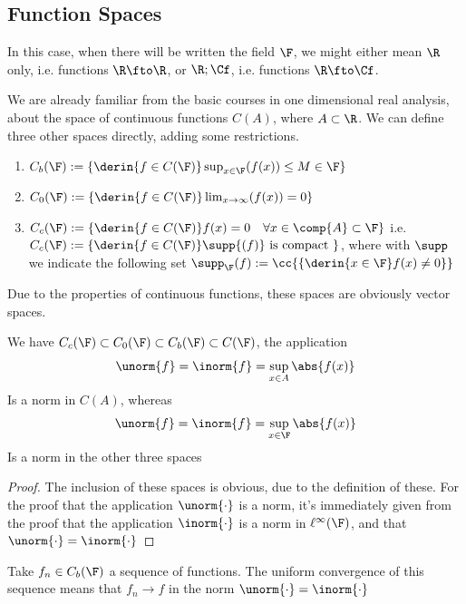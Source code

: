 \documentclass[../mmf.tex]{subfiles}
\begin{document}
\subsection{Function Spaces}
\begin{ntn}
	In this case, when there will be written the field $\F$, we might either mean $\R$ only, i.e. functions $\R\fto\R$, or $\R;\Cf$, i.e. functions $\R\fto\Cf$.
\end{ntn}
\begin{dfn}
	We are already familiar from the basic courses in one dimensional real analysis, about the space of continuous functions $C(A)$, where $A\subset\R$. We can define three other spaces directly, adding some restrictions.
	\begin{enumerate}
	\item $C_b(\F):=\{\derin{f\in C(\F)}\sup_{x\in\F}(f(x))\le M\in\F\}$
	\item $C_0(\F):=\{\derin{f\in C(\F)}\lim_{x\to\infty}(f(x))=0\}$
	\item $C_c(\F):=\{\derin{f\in C(\F)}f(x)=0\quad\forall x\in\comp{A}\subset\F\}$ i.e. $C_c(\F):=\{\derin{f\in C(\F)}\supp{(f)}\text{ is compact }\}$, where with $\supp$ we indicate the following set $\supp_{\F}(f):=\cc{\{\derin{x\in\F}f(x)\ne 0\}}$
	\end{enumerate}
\end{dfn}
Due to the properties of continuous functions, these spaces are obviously vector spaces.
\begin{prop}
	We have $C_c(\F)\subset C_0(\F)\subset C_b(\F)\subset C(\F)$, the application
	\begin{equation}
		\unorm{f}=\inorm{f}=\sup_{x\in A}\abs{f(x)}
		\label{eq:unormf}
	\end{equation}
	Is a norm in $C(A)$, whereas
	\begin{equation}
		\unorm{f}=\inorm{f}=\sup_{x\in\F}\abs{f(x)}
		\label{eq:unormf2}
	\end{equation}
	Is a norm in the other three spaces
\end{prop}
\begin{proof}
	The inclusion of these spaces is obvious, due to the definition of these. For the proof that the application $\unorm{\cdot}$ is a norm, it's immediately given from the proof that the application $\inorm{\cdot}$ is a norm in $\ell^\infty(\F)$, and that $\unorm{\cdot}=\inorm{\cdot}$
\end{proof}
\begin{rmk}
	Take $f_n\in C_b(\F)$ a sequence of functions. The uniform convergence of this sequence means that $f_n\to f$ in the norm $\unorm{\cdot}=\inorm{\cdot}$
\end{rmk}
\end{document}
